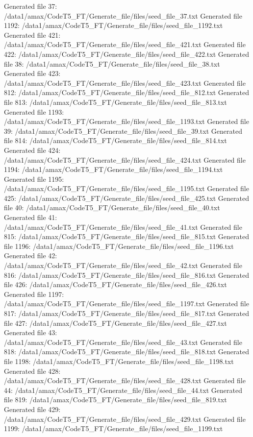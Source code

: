 Generated file 37: /data1/amax/CodeT5_FT/Generate_file/files/seed_file_37.txt
Generated file 1192: /data1/amax/CodeT5_FT/Generate_file/files/seed_file_1192.txt
Generated file 421: /data1/amax/CodeT5_FT/Generate_file/files/seed_file_421.txt
Generated file 422: /data1/amax/CodeT5_FT/Generate_file/files/seed_file_422.txt
Generated file 38: /data1/amax/CodeT5_FT/Generate_file/files/seed_file_38.txt
Generated file 423: /data1/amax/CodeT5_FT/Generate_file/files/seed_file_423.txt
Generated file 812: /data1/amax/CodeT5_FT/Generate_file/files/seed_file_812.txt
Generated file 813: /data1/amax/CodeT5_FT/Generate_file/files/seed_file_813.txt
Generated file 1193: /data1/amax/CodeT5_FT/Generate_file/files/seed_file_1193.txt
Generated file 39: /data1/amax/CodeT5_FT/Generate_file/files/seed_file_39.txt
Generated file 814: /data1/amax/CodeT5_FT/Generate_file/files/seed_file_814.txt
Generated file 424: /data1/amax/CodeT5_FT/Generate_file/files/seed_file_424.txt
Generated file 1194: /data1/amax/CodeT5_FT/Generate_file/files/seed_file_1194.txt
Generated file 1195: /data1/amax/CodeT5_FT/Generate_file/files/seed_file_1195.txt
Generated file 425: /data1/amax/CodeT5_FT/Generate_file/files/seed_file_425.txt
Generated file 40: /data1/amax/CodeT5_FT/Generate_file/files/seed_file_40.txt
Generated file 41: /data1/amax/CodeT5_FT/Generate_file/files/seed_file_41.txt
Generated file 815: /data1/amax/CodeT5_FT/Generate_file/files/seed_file_815.txt
Generated file 1196: /data1/amax/CodeT5_FT/Generate_file/files/seed_file_1196.txt
Generated file 42: /data1/amax/CodeT5_FT/Generate_file/files/seed_file_42.txt
Generated file 816: /data1/amax/CodeT5_FT/Generate_file/files/seed_file_816.txt
Generated file 426: /data1/amax/CodeT5_FT/Generate_file/files/seed_file_426.txt
Generated file 1197: /data1/amax/CodeT5_FT/Generate_file/files/seed_file_1197.txt
Generated file 817: /data1/amax/CodeT5_FT/Generate_file/files/seed_file_817.txt
Generated file 427: /data1/amax/CodeT5_FT/Generate_file/files/seed_file_427.txt
Generated file 43: /data1/amax/CodeT5_FT/Generate_file/files/seed_file_43.txt
Generated file 818: /data1/amax/CodeT5_FT/Generate_file/files/seed_file_818.txt
Generated file 1198: /data1/amax/CodeT5_FT/Generate_file/files/seed_file_1198.txt
Generated file 428: /data1/amax/CodeT5_FT/Generate_file/files/seed_file_428.txt
Generated file 44: /data1/amax/CodeT5_FT/Generate_file/files/seed_file_44.txt
Generated file 819: /data1/amax/CodeT5_FT/Generate_file/files/seed_file_819.txt
Generated file 429: /data1/amax/CodeT5_FT/Generate_file/files/seed_file_429.txt
Generated file 1199: /data1/amax/CodeT5_FT/Generate_file/files/seed_file_1199.txt
